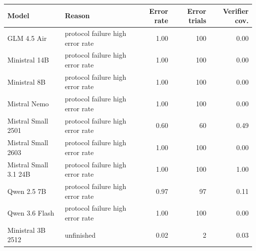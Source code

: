 \begin{tabular}{llrrr}
\toprule
Model & Reason & Error rate & Error trials & Verifier cov. \\
\midrule
GLM 4.5 Air & protocol failure high error rate & 1.00 & 100 & 0.00 \\
Ministral 14B & protocol failure high error rate & 1.00 & 100 & 0.00 \\
Ministral 8B & protocol failure high error rate & 1.00 & 100 & 0.00 \\
Mistral Nemo & protocol failure high error rate & 1.00 & 100 & 0.00 \\
Mistral Small 2501 & protocol failure high error rate & 0.60 & 60 & 0.49 \\
Mistral Small 2603 & protocol failure high error rate & 1.00 & 100 & 0.00 \\
Mistral Small 3.1 24B & protocol failure high error rate & 1.00 & 100 & 1.00 \\
Qwen 2.5 7B & protocol failure high error rate & 0.97 & 97 & 0.11 \\
Qwen 3.6 Flash & protocol failure high error rate & 1.00 & 100 & 0.00 \\
Ministral 3B 2512 & unfinished & 0.02 & 2 & 0.03 \\
\bottomrule
\end{tabular}
